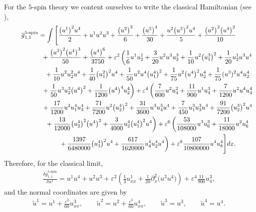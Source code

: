 \documentclass[pdftex]{sigma}
\numberwithin{equation}{section}
\newcommand{\tu}{{\widetilde u}}
\newcommand{\og}{\overline g}
\def\d{{\partial}}
\newcommand{\<}{\left<}
\renewcommand{\>}{\right>}
\newcommand{\eps}{\varepsilon}
\begin{document}
For the $5$-spin theory we content ourselves to write the classical Hamiltonian (see \cite{BG15}),
\begin{gather*}
\og^{5\text{-spin}}_{1,1}=\int\Bigg[\frac{\big(u^1\big)^2 u^4}{2}+u^1 u^2 u^3+\frac{\big(u^2\big)^3}{6}+\frac{\big(u^3\big)^4}{30}+\frac{u^2\big(u^3\big)^2 u^4}{5}+\frac{\big(u^2\big)^2 \big(u^4\big)^2}{10}\\
\hphantom{\og^{5\text{-spin}}_{1,1}=\int\Bigg[}{}+\frac{\big(u^3\big)^2 \big(u^4\big)^3}{50} +\frac{\big(u^4\big)^6}{3750} + \eps^2\left(\frac{1}{6}u^1u^1_2+\frac{3}{20}u^2 u^3 u^3_2+\frac{1}{10}u^2\big(u^3_1\big)^2+\frac{1}{20}u^1_2 u^3 u^4\right. \\
\hphantom{\og^{5\text{-spin}}_{1,1}=\int\Bigg[}{}
+\frac{1}{10}u^2 u^2_2 u^4+\frac{1}{40} \big(u^2_1\big)^2 u^4 +\frac{1}{50} u^2 u^4\big(u^4_1\big)^2+\frac{1}{75} u^2 \big(u^4\big)^2 u^4_2+\frac{1}{75}(u^3)^2 u^4u^4_2\\
\left.\hphantom{\og^{5\text{-spin}}_{1,1}=\int\Bigg[}{}
+\frac{1}{50} u^3 u^3_2\big(u^4\big)^2+\frac{1}{1200}\big(u^4\big)^4 u^4_2\right)
+\eps^4\left(\frac{7}{600}u^2 u^2_4+\frac{11}{900}u^1 u^3_4+\frac{7}{1200}u^2 u^4 u^4_4\right.\\
\hphantom{\og^{5\text{-spin}}_{1,1}=\int\Bigg[}{}
+\frac{17}{1200}u^2 u^4_1 u^4_3+\frac{71}{7200}u^2 \big(u^4_2\big)^2+\frac{31}{3600}u^3 u^3_4 u^4 +\frac{7}{450}u^3_1 u^3_3 u^4+\frac{91}{7200}\big(u^3_2\big)^2 u^4\\
\left.\hphantom{\og^{5\text{-spin}}_{1,1}=\int\Bigg[}{}
+\frac{13}{12000}\big(u^4_2\big)^2\big(u^4\big)^2+\frac{3}{4000}u^4_2 \big(u^4_1\big)^2 u^4\right)
+ \eps^6\left(\frac{53}{108000}u^3 u^3_6+\frac{11}{18000}u^2 u^4_6\right.\\
\left.\hphantom{\og^{5\text{-spin}}_{1,1}=\int\Bigg[}{} +\frac{1397}{6480000}\big(u^4_3\big)^2 u^4+\frac{617}{1620000}u^4_4 u^4_2 u^4\right)
+\eps^8 \frac{107}{10800000}u^4 u^4_8\Bigg]dx.
\end{gather*}
Therefore, for the classical limit,
\begin{gather*}
\frac{\delta\og^{5\text{-spin}}_{1,1}}{\delta u^1}=u^1u^4+u^2u^3+\eps^2\left(\frac{1}{3}u^1_{xx}+\frac{1}{20}\d_x^2\big(u^3u^4\big)\right)+\eps^4\frac{11}{900}u^3_4,
\end{gather*}
and the normal coordinates are given by
\begin{gather*}
\tu^1=u^1+\frac{\eps^2}{60}u^3_{xx},\qquad
\tu^2=u^2+\frac{\eps^2}{60}u^4_{xx},\qquad
\tu^3=u^3,\qquad
\tu^4=u^4.
\end{gather*}
\end{document}
